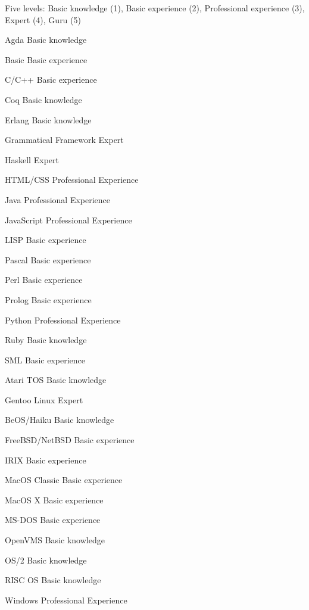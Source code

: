 \documentclass[11pt, a4]{academic-cv}
\begin{document}
Five levels: Basic knowledge (1), Basic experience (2), Professional experience (3), Expert (4), Guru (5)

\begin{cvskills}
\cvskill
{}
{Agda}
{Basic knowledge}

\cvskill
{}
{Basic}
{Basic experience}

\cvskill
{}
{C/C++}
{Basic experience}

\cvskill
{}
{Coq}
{Basic knowledge}

\cvskill
{}
{Erlang}
{Basic knowledge}

\cvskill
{}
{Grammatical Framework}
{Expert}

\cvskill
{}
{Haskell}
{Expert}

\cvskill
{}
{HTML/CSS}
{Professional Experience}

\cvskill
{}
{Java}
{Professional Experience}

\cvskill
{}
{JavaScript}
{Professional Experience}

\cvskill
{}
{LISP}
{Basic experience}

\cvskill
{}
{Pascal}
{Basic experience}

\cvskill
{}
{Perl}
{Basic experience}

\cvskill
{}
{Prolog}
{Basic experience}

\cvskill
{}
{Python}
{Professional Experience}

\cvskill
{}
{Ruby}
{Basic knowledge}

\cvskill
{}
{SML}
{Basic experience}

\end{cvskills}

\begin{cvskills}
\cvskill
{}
{Atari TOS}
{Basic knowledge}

\cvskill
{}
{Gentoo Linux}
{Expert}

\cvskill
{}
{BeOS/Haiku}
{Basic knowledge}

\cvskill
{}
{FreeBSD/NetBSD}
{Basic experience}

\cvskill
{}
{IRIX}
{Basic experience}

\cvskill
{}
{MacOS Classic}
{Basic experience}

\cvskill
{}
{MacOS X}
{Basic experience}

\cvskill
{}
{MS-DOS}
{Basic experience}

\cvskill
{}
{OpenVMS}
{Basic knowledge}

\cvskill
{}
{OS/2}
{Basic knowledge}

\cvskill
{}
{RISC OS}
{Basic knowledge}

\cvskill
{}
{Windows}
{Professional Experience}

\end{cvskills}
\end{document}
